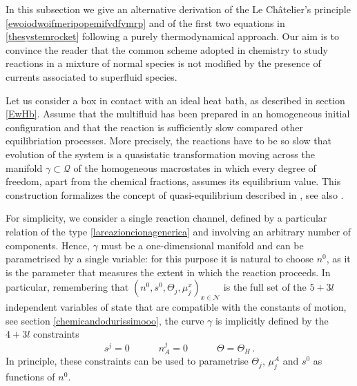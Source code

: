 \documentclass[usenatbib]{mnras}
\newcommand{\spc}{\quad \quad \quad}
\begin{document}
%

In this subsection we give an alternative derivation of the Le Ch\^atelier's principle \eqref{ewoiodwoifmeripopemifvdfvmrp} and of the first two equations in \eqref{thesystemrocket} following a purely thermodynamical approach. Our aim is to convince the reader that the common scheme adopted in chemistry to study reactions in a mixture of normal species \citep[see e.g. ][]{prigogine1969chemical} is not modified by the presence of currents associated to superfluid species.

Let us consider a box in contact with an ideal heat bath, as described in section \ref{EwHb}. 
Assume that the multifluid has been prepared in an homogeneous initial configuration and that the reaction is sufficiently slow compared  other equilibriation processes. More precisely, the reactions have to be so slow that  evolution of the system is a quasistatic transformation moving across the manifold $\gamma \subset \mathcal{Q}$ of the homogeneous macrostates in which  every degree of freedom, apart from the chemical fractions, assumes its equilibrium value. 
This construction formalizes the concept of quasi-equilibrium described in \cite{Yakovlev2001PhR}, see also  \cite{haensel_frozen}.

For simplicity, we consider a single reaction channel, defined by a particular relation of the type \eqref{lareazioncionagenerica} and involving an arbitrary number of components. 
Hence, $\gamma$ must be a one-dimensional manifold and can be parametrised by a single variable: for this purpose it is natural to choose $n^0$, as it is the parameter that measures the extent in which the reaction proceeds. 
In particular, remembering that $(n^0,s^0,\Theta_j,\mu_j^x)_{x \in \mathcal{N}}$ is the full set of the $5+3l$ independent variables of state that are compatible with the constants of motion, see section \ref{chemicandodurissimooo}, the curve $\gamma$ is  implicitly defined by the $4+3 l$ constraints
%
\begin{equation}
\label{einvewrpcompoe}
s^j =0  \spc n_A^j =0  \spc  \Theta = \Theta_H \, .
\end{equation}
%
In principle, these constraints can be used to  parametrise $\Theta_j$, $\mu_j^A$ and $s^0$ as functions of $n^0$.
\end{document}

